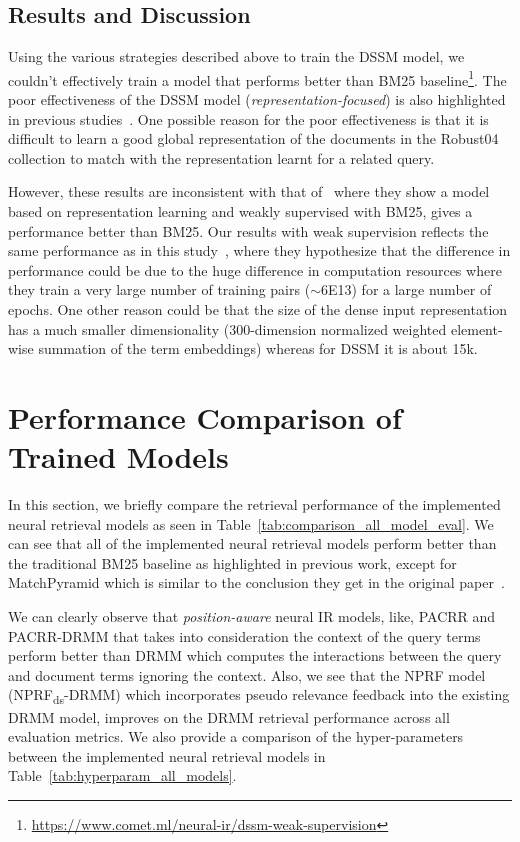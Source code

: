 \subsection{Results and Discussion}

Using the various strategies described above to train the DSSM model, we couldn't effectively train a model that performs better than BM25 baseline\footnote{\url{https://www.comet.ml/neural-ir/dssm-weak-supervision}}. The poor effectiveness of the DSSM model (\textit{representation-focused}) is also highlighted in previous studies~\citep{Guo2016, matchpyramid16}. One possible reason for the poor effectiveness is that it is difficult to learn a good global representation of the documents in the Robust04 collection to match with the representation learnt for a related query.

However, these results are inconsistent with that of~\cite{Dehghani_sigir17} where they show a model based on representation learning and weakly supervised with BM25, gives a performance better than BM25. Our results with weak supervision reflects the same performance as in this study~\citep{Nie_ictir18}, where they hypothesize that the difference in performance could be due to the huge difference in computation resources where they train a very large number of training pairs ($\sim$6E13) for a large number of epochs. One other reason could be that the size of the dense input representation has a much smaller dimensionality (300-dimension normalized weighted element-wise summation of the term embeddings) whereas for DSSM it is about 15k.

\section{Performance Comparison of Trained Models}
\label{sec:compare_perform_trained models}
In this section, we briefly compare the retrieval performance of the implemented neural retrieval models as seen in Table~\ref{tab:comparison_all_model_eval}. We can see that all of the implemented neural retrieval models perform better than the traditional BM25 baseline as highlighted in previous work, except for MatchPyramid which is similar to the conclusion they get in the original paper~\citep{matchpyramid16}. 

We can clearly observe that \textit{position-aware} neural IR models, like, PACRR and PACRR-DRMM that takes into consideration the context of the query terms perform better than DRMM which computes the interactions between the query and document terms ignoring the context. Also, we see that the NPRF model (NPRF\textsubscript{ds}-DRMM) which incorporates pseudo relevance feedback into the existing DRMM model, improves on the DRMM retrieval performance across all evaluation metrics. We also provide a comparison of the hyper-parameters between the implemented neural retrieval models in Table~\ref{tab:hyperparam_all_models}.

